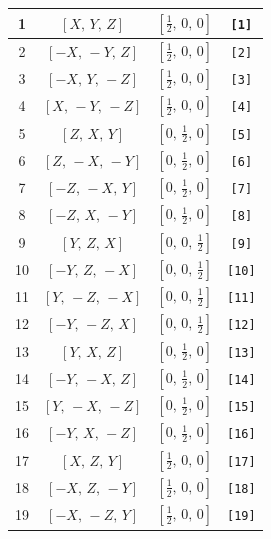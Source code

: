\documentclass[fleqn,8pt]{jsarticle}
\begin{document}
\begin{longtable}{cccc}
1 & $\left[ X,\, Y,\, Z \right]$ & $\left[ \frac{1}{2},\, 0,\, 0 \right]$ & {\tt [1]} \\ \hline
2 & $\left[ - X,\, - Y,\, Z \right]$ & $\left[ \frac{1}{2},\, 0,\, 0 \right]$ & {\tt [2]} \\ \hline
3 & $\left[ - X,\, Y,\, - Z \right]$ & $\left[ \frac{1}{2},\, 0,\, 0 \right]$ & {\tt [3]} \\ \hline
4 & $\left[ X,\, - Y,\, - Z \right]$ & $\left[ \frac{1}{2},\, 0,\, 0 \right]$ & {\tt [4]} \\ \hline
5 & $\left[ Z,\, X,\, Y \right]$ & $\left[ 0,\, \frac{1}{2},\, 0 \right]$ & {\tt [5]} \\ \hline
6 & $\left[ Z,\, - X,\, - Y \right]$ & $\left[ 0,\, \frac{1}{2},\, 0 \right]$ & {\tt [6]} \\ \hline
7 & $\left[ - Z,\, - X,\, Y \right]$ & $\left[ 0,\, \frac{1}{2},\, 0 \right]$ & {\tt [7]} \\ \hline
8 & $\left[ - Z,\, X,\, - Y \right]$ & $\left[ 0,\, \frac{1}{2},\, 0 \right]$ & {\tt [8]} \\ \hline
9 & $\left[ Y,\, Z,\, X \right]$ & $\left[ 0,\, 0,\, \frac{1}{2} \right]$ & {\tt [9]} \\ \hline
10 & $\left[ - Y,\, Z,\, - X \right]$ & $\left[ 0,\, 0,\, \frac{1}{2} \right]$ & {\tt [10]} \\ \hline
11 & $\left[ Y,\, - Z,\, - X \right]$ & $\left[ 0,\, 0,\, \frac{1}{2} \right]$ & {\tt [11]} \\ \hline
12 & $\left[ - Y,\, - Z,\, X \right]$ & $\left[ 0,\, 0,\, \frac{1}{2} \right]$ & {\tt [12]} \\ \hline
13 & $\left[ Y,\, X,\, Z \right]$ & $\left[ 0,\, \frac{1}{2},\, 0 \right]$ & {\tt [13]} \\ \hline
14 & $\left[ - Y,\, - X,\, Z \right]$ & $\left[ 0,\, \frac{1}{2},\, 0 \right]$ & {\tt [14]} \\ \hline
15 & $\left[ Y,\, - X,\, - Z \right]$ & $\left[ 0,\, \frac{1}{2},\, 0 \right]$ & {\tt [15]} \\ \hline
16 & $\left[ - Y,\, X,\, - Z \right]$ & $\left[ 0,\, \frac{1}{2},\, 0 \right]$ & {\tt [16]} \\ \hline
17 & $\left[ X,\, Z,\, Y \right]$ & $\left[ \frac{1}{2},\, 0,\, 0 \right]$ & {\tt [17]} \\ \hline
18 & $\left[ - X,\, Z,\, - Y \right]$ & $\left[ \frac{1}{2},\, 0,\, 0 \right]$ & {\tt [18]} \\ \hline
19 & $\left[ - X,\, - Z,\, Y \right]$ & $\left[ \frac{1}{2},\, 0,\, 0 \right]$ & {\tt [19]} \\ \hline

\end{longtable}
\end{document}
